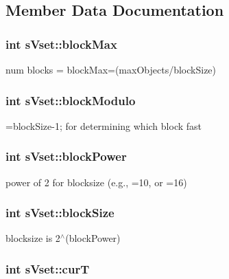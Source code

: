 \subsection{Member Data Documentation}
\subsubsection[{blockMax}]{\setlength{\rightskip}{0pt plus 5cm}int {\bf sVset::blockMax}}\label{a00006_aa9dd2d95c9e71f01b9f6a0e8c240621a}


num blocks = blockMax=(maxObjects/blockSize) 

\subsubsection[{blockModulo}]{\setlength{\rightskip}{0pt plus 5cm}int {\bf sVset::blockModulo}}\label{a00006_a0b9f1625bf97c1abae2db0346295855b}


=blockSize-\/1; for determining which block fast 

\subsubsection[{blockPower}]{\setlength{\rightskip}{0pt plus 5cm}int {\bf sVset::blockPower}}\label{a00006_add65a271783642c1f7b8b3d872341752}


power of 2 for blocksize (e.g., =10, or =16) 

\subsubsection[{blockSize}]{\setlength{\rightskip}{0pt plus 5cm}int {\bf sVset::blockSize}}\label{a00006_a5882d40eb0e55fce8c7a8ca9c81bd762}


blocksize is 2$^\wedge$(blockPower) 

\subsubsection[{curT}]{\setlength{\rightskip}{0pt plus 5cm}int {\bf sVset::curT}}\label{a00006_a9ae2055f85dfdf8a38382e2411e998aa}



